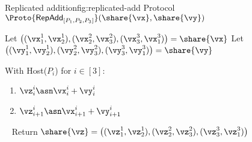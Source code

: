 \begin{Boxfig}{Replicated addition}{fig:replicated-add}
  {Protocol $\Proto{\mathsf{RepAdd}_{[P_1, P_2, P_3]}}(\share{\vx}, \share{\vy})$}
  
  Let $\big((\vx_1^1, \vx_2^1), (\vx_2^2, \vx_3^2), (\vx_3^3, \vx_1^3) \big) = \share{\vx}$ \newline
  Let $\big((\vy_1^1, \vy_2^1), (\vy_2^2, \vy_3^2), (\vy_3^3, \vy_1^3) \big) = \share{\vy}$ \newline
  
  With Host($P_i$) for $i \in [3]$:
  \begin{enumerate}
    \item $\vz_i^i \asn \vx_i^i + \vy_i^i$
    \item $\vz_{i+1}^i \asn \vx_{i+1}^i + \vy_{i+1}^i$
  \end{enumerate}
  ~\newline
  Return $\share{\vz} = \big((\vz_1^1, \vz_2^1), (\vz_2^2, \vz_3^2), (\vz_3^3, \vz_1^3) \big)$
\end{Boxfig}
